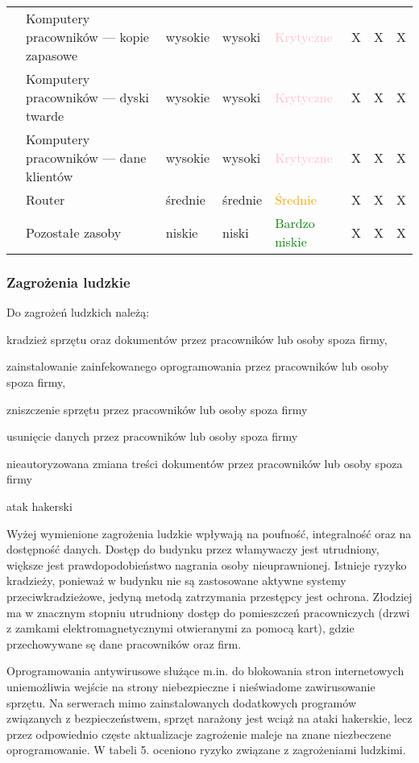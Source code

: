\begin{landscape}
\begin{longtable}[ht!]{|m{3cm}|m{6cm}|m{4.5cm}|m{3cm}|m{3cm}|m{0.5cm}|m{0.5cm}|m{0.5cm}|}
		& Komputery pracowników --- kopie zapasowe & wysokie & wysoki & \textcolor{pink}{Krytyczne} & X & X & X  \\ \cline{2-8}
		& Komputery pracowników --- dyski twarde  & wysokie  & wysoki & \textcolor{pink}{Krytyczne}& X & X & X  \\ \cline{2-8}
		& Komputery pracowników --- dane klientów & wysokie & wysoki & \textcolor{pink}{Krytyczne} & X & X & X  \\ \cline{2-8}
		& Router & średnie  & średnie & \textcolor{orange}{Średnie} & X & X & X  \\ \cline{2-8}
		& Pozostałe zasoby & niskie  & niski & \textcolor{green}{Bardzo niskie} & X & X & X  \\
		\hline
	\end{longtable}
\end{landscape}



\subsubsection{Zagrożenia ludzkie}
Do zagrożeń ludzkich należą: 
\begin{itemize*}
	\item kradzież sprzętu oraz dokumentów przez pracowników lub osoby spoza firmy,
	\item zainstalowanie zainfekowanego oprogramowania przez pracowników lub osoby spoza firmy,
	\item zniszczenie sprzętu przez pracowników lub osoby spoza firmy
	\item usunięcie danych przez pracowników lub osoby spoza firmy
	\item nieautoryzowana zmiana treści dokumentów przez pracowników lub osoby spoza firmy
	\item atak hakerski 
\end{itemize*}

Wyżej wymienione zagrożenia ludzkie wpływają na poufność, integralność oraz na dostępność danych. Dostęp do budynku przez włamywaczy jest utrudniony, większe jest prawdopodobieństwo nagrania osoby nieuprawnionej. Istnieje ryzyko kradzieży, ponieważ w budynku nie są zastosowane aktywne systemy przeciwkradzieżowe, jedyną metodą zatrzymania przestępcy jest ochrona. Złodziej ma w znacznym stopniu utrudniony dostęp do pomieszczeń pracowniczych (drzwi z zamkami elektromagnetycznymi otwieranymi za pomocą kart), gdzie przechowywane sę dane pracowników oraz firm. 

 Oprogramowania antywirusowe służące m.in. do blokowania stron internetowych uniemożliwia wejście na strony niebezpieczne i nieświadome zawirusowanie sprzętu. Na serwerach mimo zainstalowanych dodatkowych programów związanych z bezpieczeństwem, sprzęt narażony jest wciąż na ataki hakerskie, lecz przez odpowiednio częste aktualizacje zagrożenie maleje na znane niezbeczene oprogramowanie.
W tabeli 5. oceniono ryzyko związane z zagrożeniami ludzkimi.

